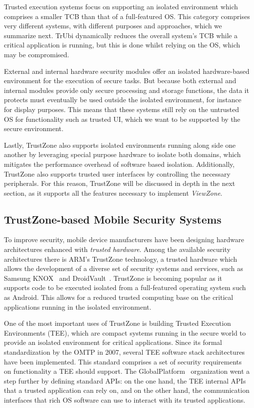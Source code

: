 Trusted execution systems focus on supporting an isolated environment which comprises a smaller TCB than that of a full-featured OS. This category comprises very different systems, with different purposes and approaches, which we summarize next. TrUbi dynamically reduces the overall system's TCB while a critical application is running, but this is done whilst relying on the OS, which may be compromised.

External and internal hardware security modules offer an isolated hardware-based environment for the execution of secure tasks. But because both external and internal modules provide only secure processing and storage functions, the data it protects must eventually be used outside the isolated environment, for instance for display purposes. This means that these systems still rely on the untrusted OS for functionality such as trusted UI, which we want to be supported by the secure environment.

Lastly, TrustZone also supports isolated environments running along side one another by leveraging special purpose hardware to isolate both domains, which mitigates the performance overhead of software based isolation. Additionally, TrustZone also supports trusted user interfaces by controlling the necessary peripherals. For this reason, TrustZone will be discussed in depth in the next section, as it supports all the features necessary to implement \emph{ViewZone}.

\subsection{TrustZone-based Mobile Security Systems}
\label{sec:trustzone}

To improve security, mobile device manufacturers have been designing hardware architectures enhanced with \emph{trusted hardware}. Among the available security architectures there is ARM's TrustZone technology, a trusted hardware which allows the development of a diverse set of security systems and services, such as Samsung KNOX~\cite{knox_whitepaper} and DroidVault~\cite{li2014droidvault}. TrustZone is becoming popular as it supports code to be executed isolated from a full-featured operating system such as Android. This allows for a reduced trusted computing base on the critical applications running in the isolated environment.

One of the most important uses of TrustZone is building Trusted Execution Environments (TEE), which are compact systems running in the secure world to provide an isolated environment for critical applications. Since its formal standardization by the OMTP in 2007, several \ac{TEE} software stack architectures have been implemented. This standard comprises a set of security requirements on functionality a TEE should support. The GlobalPlatform~\cite{global} organization went a step further by defining standard APIs: on the one hand, the TEE internal APIs that a trusted application can rely on, and on the other hand, the communication interfaces that rich OS software can use to interact with its trusted applications.

